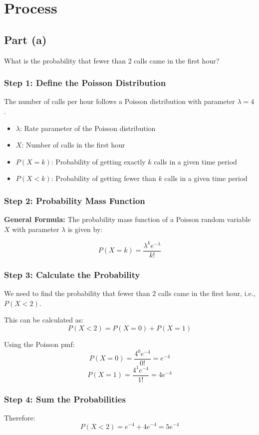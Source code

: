 \documentclass[12pt]{article}
\begin{document}
\section*{Process}

\subsection*{Part (a)} What is the probability that fewer than 2 calls came in the first hour?

\subsubsection*{Step 1: Define the Poisson Distribution}
The number of calls per hour follows a Poisson distribution with parameter \( \lambda = 4 \).
\begin{itemize}
  \item \( \lambda \): Rate parameter of the Poisson distribution
  \item \( X \): Number of calls in the first hour
  \item \( P(X = k) \): Probability of getting exactly \( k \) calls in a given time period
  \item \( P(X < k) \): Probability of getting fewer than \( k \) calls in a given time period
\end{itemize}

\subsubsection*{Step 2: Probability Mass Function}
\textbf{General Formula:} The probability mass function of a Poisson random variable \( X \) with parameter \( \lambda \) is given by:

\[ P(X = k) = \frac{\lambda^k e^{-\lambda}}{k!} \]

\subsubsection*{Step 3: Calculate the Probability}
We need to find the probability that fewer than 2 calls came in the first hour, i.e., \( P(X < 2) \).

This can be calculated as:
\[ P(X < 2) = P(X = 0) + P(X = 1) \]

Using the Poisson pmf:
\[ P(X = 0) = \frac{4^0 e^{-4}}{0!} = e^{-4} \]
\[ P(X = 1) = \frac{4^1 e^{-4}}{1!} = 4e^{-4} \]

\subsubsection*{Step 4: Sum the Probabilities}
Therefore:
\[ P(X < 2) = e^{-4} + 4e^{-4} = 5e^{-4} \]
\end{document}
